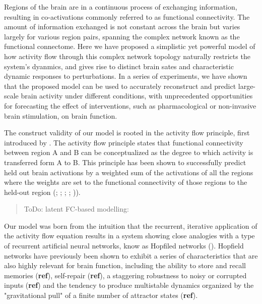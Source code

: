 \documentclass{article}
\begin{document}
Regions of the brain are in a continuous process of exchanging information, resulting in co-activations commonly referred to as functional connectivity.
The amount of information exchanged is not constant across the brain but varies largely for various region pairs, spanning the complex network known as the functional connectome.
Here we have proposed a simplistic yet powerful model of how activity flow through this complex network topology naturally restricts the system's dyanmics, and gives rise to distinct brain sates and characteristic dynamic responses to perturbations.
In a series of experiments, we have shown that the proposed model can be used to accurately reconstruct and predict large-scale brain activity under different conditions, with unprecedented opportunities for forecasting the effect of interventions, such as pharmacological or non-invasive brain stimulation, on brain function.

The construct validity of our model is rooted in the activity flow principle, first introduced by \href{https://doi.org/10.1038/nn.4406}{}. The activity flow principle states that functional connectivity between region A and B can be conceptualized as the degree to which activity is transferred form A to B. This principle has been shown to successfully predict held out brain activations by a weighted sum of the activations of all the regions where the weights are set to the functional connectivity of those regions to the held-out region (\href{https://doi.org/10.1038/nn.4406}{}; \href{https://doi.org/10.1038/s41467-017-01000-w}{}; \href{https://doi.org/10.1371/journal.pbio.3001686}{}; \href{https://doi.org/10.1126/sciadv.abf2513}{}; \href{https://doi.org/10.1089/brain.2018.0586}{})).

\begin{quote}
ToDo: latent FC-based modelling: \href{https://doi.org/10.1162/netn\_a\_00234}{}
\end{quote}

Our model was born from the intuition that the recurrent, iterative application of the activity flow equation results in a system showing close analogies with a type of recurrent artificial neural networks, know as Hopfiled networks (\href{https://doi.org/10.1073/pnas.79.8.2554}{}).
Hopfield networks have previously been shown to exhibit a series of characteristics that are also highly relevant for brain function, including the ability to store and recall memories (\textbf{ref}), self-repair (\textbf{ref}), a staggering robustness to noisy or corrupted inputs (\textbf{ref}) and the tendency to produce multistable dynamics organized by the "gravitational pull" of a finite number of attractor states (\textbf{ref}).
\end{document}
